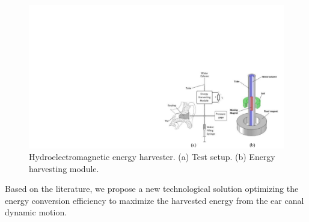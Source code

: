 \documentclass[3p,twocolumn,preprint]{elsarticle}
\begin{document}
\begin{figure}[!htbp]
	\centering
	\captionsetup{justification=centering}
	\includegraphics[trim={18cm 0cm 0cm 8.75cm},clip, width=\linewidth]{figures/critias_emag.pdf}
	\caption{Hydroelectromagnetic energy harvester. (a) Test setup. (b) Energy harvesting module. \cite{Delnavaz2012}} 
	\label{fig:critias_emag}
\end{figure}
\begin{table}[!htbp]
	\centering
	\captionsetup{justification=centering}
	\caption{Existing harvesters exploiting the ear canal deformation energy}
	\label{tab:harvesters_ear}
\end{table}
Based on the literature, we propose a new technological solution optimizing the energy conversion efficiency to maximize the harvested energy from the ear canal dynamic motion. 
\end{document}
